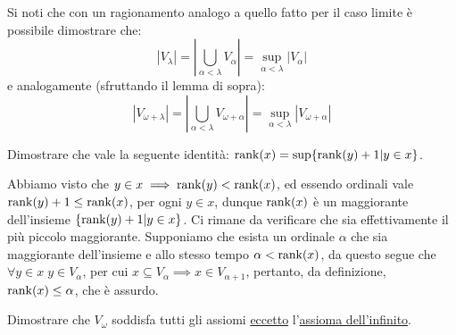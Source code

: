 \begin{remark}
	Si noti che con un ragionamento analogo a quello fatto per il caso limite è possibile dimostrare che:
	\[ |V_\lambda| = \left\lvert \bigcup_{\alpha < \lambda} V_\alpha\right\rvert = \sup_{\alpha < \lambda} |V_\alpha|
		\]
	e analogamente (sfruttando il lemma di sopra):
	\[ |V_{\omega + \lambda}| = \left\lvert \bigcup_{\alpha < \lambda} V_{\omega + \alpha}\right\rvert = \sup_{\alpha < \lambda} |V_{\omega + \alpha}|
		\]
\end{remark}

\begin{exercise}
	Dimostrare che vale la seguente identità: $\operatorname{rank}(x) = \sup\{\operatorname{rank}(y) + 1 | y \in x\}$.
\end{exercise}

\begin{soln}
	Abbiamo visto che $y \in x \implies \operatorname{rank}(y) < \operatorname{rank} (x)$, ed essendo ordinali vale $\operatorname{rank}(y) + 1 \leq \operatorname{rank}(x)$, per ogni $y \in x$, dunque $\operatorname{rank}(x)$ è un maggiorante dell'insieme $\{\operatorname{rank}(y) + 1 | y \in x\}$. Ci rimane da verificare che sia effettivamente il più piccolo maggiorante.
	Supponiamo che esista un ordinale $\alpha$ che sia maggiorante dell'insieme e allo stesso tempo $\alpha < \operatorname{rank}(x)$, da questo segue che $\forall y \in x \; y \in V_\alpha$, per cui $x \subseteq V_\alpha \implies x \in V_{\alpha + 1}$, pertanto, da definizione, $\operatorname{rank}(x) \leq \alpha$, che è assurdo.
\end{soln}

\begin{exercise}[$V_\omega$]
	Dimostrare che $V_\omega$ soddisfa tutti gli assiomi \underline{eccetto} l'\hyperref[ax7]{assioma dell'infinito}.
\end{exercise}

